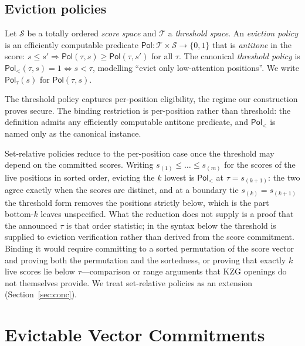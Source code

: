 \documentclass[version=submission]{iacrcc}
\theoremstyle{definition}
\newcommand{\bit}{\{0,1\}}
\newcommand{\Pol}{\mathsf{Pol}}
\newcommand{\Ssp}{\mathcal{S}}
\newcommand{\Tsp}{\mathcal{T}}
\begin{document}
\subsection{Eviction policies}

\begin{definition}\label{def:policy}
Let $\Ssp$ be a totally ordered \emph{score space} and $\Tsp$ a \emph{threshold
space}. An \emph{eviction policy} is an efficiently computable predicate
$\Pol:\Tsp\times\Ssp\to\bit$ that is \emph{antitone} in the score:
$s\le s'\Rightarrow\Pol(\tau,s)\ge\Pol(\tau,s')$ for all $\tau$. The canonical
\emph{threshold policy} is $\Pol_{<}(\tau,s)=1\iff s<\tau$, modelling ``evict
only low-attention positions''. We write $\Pol_\tau(s)$ for $\Pol(\tau,s)$.
\end{definition}

\begin{remark}
The threshold policy captures per-position eligibility, the regime our
construction proves secure. The binding restriction is per-position rather than
threshold: the definition admits any efficiently computable antitone predicate,
and $\Pol_{<}$ is named only as the canonical instance.

Set-relative policies reduce to the per-position case once the threshold may
depend on the committed scores. Writing $s_{(1)}\le\dots\le s_{(m)}$ for the
scores of the live positions in sorted order, evicting the $k$ lowest is
$\Pol_{<}$ at $\tau=s_{(k+1)}$: the two agree exactly when the scores are
distinct, and at a boundary tie $s_{(k)}=s_{(k+1)}$ the threshold form removes
the positions strictly below, which is the part bottom-$k$ leaves unspecified.
What the reduction does not supply is a proof that the announced $\tau$ is that
order statistic; in the syntax below the threshold is supplied to eviction
verification rather than derived from the score commitment. Binding it would
require committing to a sorted permutation of the score vector and proving both
the permutation and the sortedness, or proving that exactly $k$ live scores lie
below $\tau$---comparison or range arguments that KZG openings do not
themselves provide. We treat set-relative policies as an extension
(Section~\ref{sec:conc}).
\end{remark}

\section{Evictable Vector Commitments}\label{sec:syntax}
\end{document}
